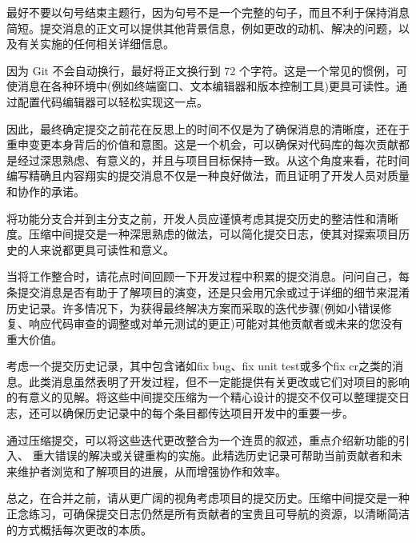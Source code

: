 最好不要以句号结束主题行，因为句号不是一个完整的句子，而且不利于保持消息简短。提交消息的正文可以提供其他背景信息，例如更改的动机、解决的问题，以及有关实施的任何相关详细信息。

因为 Git 不会自动换行，最好将正文换行到 72 个字符。这是一个常见的惯例，可使消息在各种环境中(例如终端窗口、文本编辑器和版本控制工具)更具可读性。通过配置代码编辑器可以轻松实现这一点。

因此，最终确定提交之前花在反思上的时间不仅是为了确保消息的清晰度，还在于重申变更本身背后的价值和意图。这是一个机会，可以确保对代码库的每次贡献都是经过深思熟虑、有意义的，并且与项目目标保持一致。从这个角度来看，花时间编写精确且内容翔实的提交消息不仅是一种良好做法，而且证明了开发人员对质量和协作的承诺。


将功能分支合并到主分支之前，开发人员应谨慎考虑其提交历史的整洁性和清晰度。压缩中间提交是一种深思熟虑的做法，可以简化提交日志，使其对探索项目历史的人来说都更具可读性和意义。

当将工作整合时，请花点时间回顾一下开发过程中积累的提交消息。问问自己，每条提交消息是否有助于了解项目的演变，还是只会用冗余或过于详细的细节来混淆历史记录。许多情况下，为获得最终解决方案而采取的迭代步骤(例如小错误修复、响应代码审查的调整或对单元测试的更正)可能对其他贡献者或未来的您没有重大价值。

考虑一个提交历史记录，其中包含诸如fix bug、fix unit test或多个fix cr之类的消息。此类消息虽然表明了开发过程，但不一定能提供有关更改或它们对项目的影响的有意义的见解。将这些中间提交压缩为一个精心设计的提交不仅可以整理提交日志，还可以确保历史记录中的每个条目都传达项目开发中的重要一步。

通过压缩提交，可以将这些迭代更改整合为一个连贯的叙述，重点介绍新功能的引入、 重大错误的解决或关键重构的实施。此精选历史记录可帮助当前贡献者和未来维护者浏览和了解项目的进展，从而增强协作和效率。

总之，在合并之前，请从更广阔的视角考虑项目的提交历史。压缩中间提交是一种正念练习，可确保提交日志仍然是所有贡献者的宝贵且可导航的资源，以清晰简洁的方式概括每次更改的本质。














